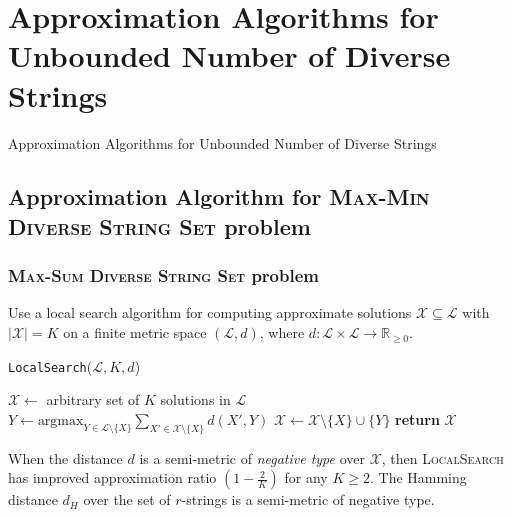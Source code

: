 \documentclass{beamer}
\begin{document}
\section{Approximation Algorithms for Unbounded Number of Diverse Strings}
\begin{frame}
    \begin{center}
        \huge{Approximation Algorithms for Unbounded Number of Diverse Strings}
    \end{center}
\end{frame}

\subsection{Approximation Algorithm for \textsc{Max-Min Diverse String Set} problem}
\begin{frame}
    \frametitle{\textsc{Max-Sum Diverse String Set} problem}
    Use a local search algorithm for computing approximate solutions $\mathcal{X} \subseteq \mathcal{L}$ with $|\mathcal{X}| = K$ on a finite metric space $(\mathcal{L}, d)$, where $d: \mathcal{L} \times \mathcal{L} \to \mathbb{R}_{\geq 0}$.

    \begin{algorithm}[H] \label{alg:LocalSearch}
        \footnotesize{\caption{\texttt{LocalSearch}($\mathcal{L}, K, d$)}}
        \footnotesize{\begin{algorithmic}[1]
            \State $\mathcal{X} \gets$ arbitrary set of $K$ solutions in $\mathcal{L}$
                    \State $Y \gets \text{argmax}_{Y \in \mathcal{L} \setminus \{X\}} \sum_{X' \in \mathcal{X} \setminus \{X\}} d(X', Y)$
                    \State $\mathcal{X} \gets \mathcal{X} \setminus \{X\} \cup \{Y\}$
                \EndFor
            \EndFor
            \State \textbf{return} $\mathcal{X}$
        \end{algorithmic}}
    \end{algorithm}

    \begin{theorem}
        \small{When the distance $d$ is a semi-metric of \emph{negative type} over $\mathcal{X}$, then \textsc{LocalSearch} has improved approximation ratio $(1 - \frac{2}{K})$ for any $K \geq 2$. The Hamming distance $d_H$ over the set of $r$-strings is a semi-metric of negative type.}
    \end{theorem}
\end{frame}
\end{document}
